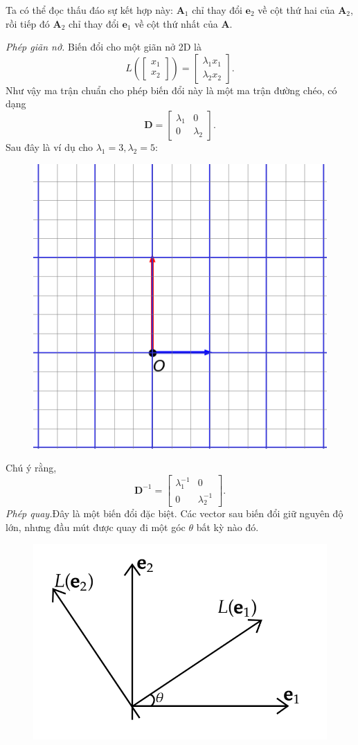  Ta có thể đọc thấu đáo sự kết hợp này: \(\mathbf{A}_1\) chỉ thay đổi \(\mathbf{e}_2\) về cột thứ hai của \(\mathbf{A}_2\), rồi tiếp đó \(\mathbf{A}_2\) chỉ thay đổi \(\mathbf{e}_1\) về cột thứ nhất của \(\mathbf{A}\).
 \vspace{8pt}

\emph{Phép giãn nở.}\newline
Biến đổi cho một giãn nở 2D là 
\[L\left(\begin{bmatrix}
    x_1 \\x_2
\end{bmatrix}\right)=\begin{bmatrix}
    \lambda_1 x_1 \\\lambda_2 x_2
\end{bmatrix}.\] Như vậy ma trận chuẩn cho phép biến đổi này là một ma trận đường chéo,  có dạng
\[\mathbf{D}=\begin{bmatrix}
    \lambda_1 &0\\0&\lambda_2
\end{bmatrix}.\] Sau đây là ví dụ cho \(\lambda_1=3, \lambda_2 =5\):
\begin{figure}[H]
    \centering
    \includegraphics[width=0.5\linewidth]{Tuan2/Figures/LT6}
\end{figure}
Chú ý rằng, 
\[\mathbf{D}^{-1}=\begin{bmatrix}
    \lambda_{1}^{-1}&0\\0&\lambda_{2}^{-1}
\end{bmatrix}.\]
\emph{Phép quay.}\newline Đây là một biến đổi đặc biệt. Các vector sau biến đổi giữ nguyên độ lớn, nhưng đầu mút được quay đi một góc \(\theta\) bất kỳ nào đó.
\begin{figure}[H]
    \centering
    \includegraphics[width=0.6\linewidth]{Tuan2/Figures/rotation.png}
\end{figure}
